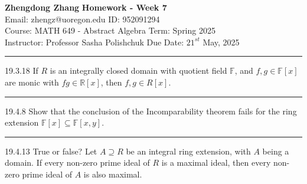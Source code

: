 \documentclass[letterpaper, 12pt]{article}
\begin{document}
\noindent
\large\textbf{Zhengdong Zhang} \hfill \textbf{Homework - Week 7} \\
Email: zhengz@uoregon.edu \hfill ID: 952091294 \\
\normalsize Course: MATH 649 - Abstract Algebra \hfill Term: Spring 2025 \\
Instructor: Professor Sasha Polishchuk \hfill Due Date: $21^{st}$ May, 2025 \\
\noindent\rule{7in}{2.8pt}

\begin{problem}{19.3.18}
If \(R\) is an integrally closed domain with quotient field \(\mathbb{F}\), and \(f,g\in \mathbb{F}[x]\) are monic with \(fg\in \mathbb{R}[x]\), then \(f,g\in R[x]\).
\end{problem}
\begin{solution}

\end{solution}

\noindent\rule{7in}{2.8pt}
\begin{problem}{19.4.8}
Show that the conclusion of the Incomparability  theorem fails for the ring extension \(\mathbb{F}[x]\subseteq \mathbb{F}[x,y]\).
\end{problem}
\begin{solution}

\end{solution}

\noindent\rule{7in}{2.8pt}
\begin{problem}{19.4.13}
True or false? Let \(A\supseteq R\) be an integral ring extension, with \(A\) being a domain. If every non-zero prime ideal of \(R\) is a maximal ideal, then every non-zero prime ideal of \(A\) is also maximal.
\end{problem}
\begin{solution}

\end{solution}
\end{document}
